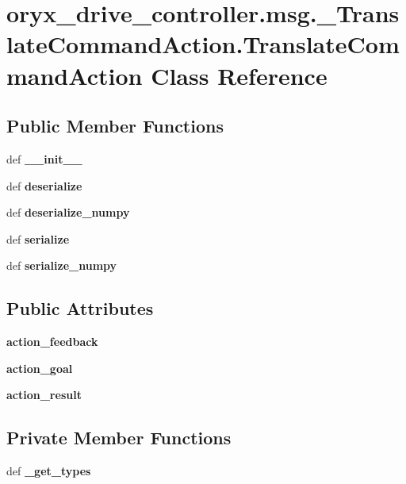 \section{oryx\-\_\-drive\-\_\-controller.\-msg.\-\_\-\-Translate\-Command\-Action.\-Translate\-Command\-Action \-Class \-Reference}
\label{classoryx__drive__controller_1_1msg_1_1__TranslateCommandAction_1_1TranslateCommandAction}
\subsection*{\-Public \-Member \-Functions}
\begin{DoxyCompactItemize}
\item 
def {\bf \-\_\-\-\_\-init\-\_\-\-\_\-}
\item 
def {\bf deserialize}
\item 
def {\bf deserialize\-\_\-numpy}
\item 
def {\bf serialize}
\item 
def {\bf serialize\-\_\-numpy}
\end{DoxyCompactItemize}
\subsection*{\-Public \-Attributes}
\begin{DoxyCompactItemize}
\item 
{\bf action\-\_\-feedback}
\item 
{\bf action\-\_\-goal}
\item 
{\bf action\-\_\-result}
\end{DoxyCompactItemize}
\subsection*{\-Private \-Member \-Functions}
\begin{DoxyCompactItemize}
\item 
def {\bf \-\_\-get\-\_\-types}
\end{DoxyCompactItemize}
